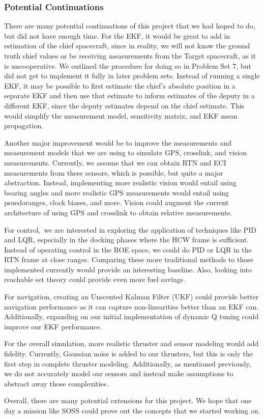 \subsubsection{Potential Continuations}
There are many potential continuations of this project that we had hoped to do, but did not have enough time. For the EKF, it would be great to add in estimation of the chief spacecraft, since in reality, we will not know the ground truth chief values or be receiving measurements from the Target spacecraft, as it is uncooperative. We outlined the procedure for doing so in Problem Set 7, but did not get to implement it fully in later problem sets. Instead of running a single EKF, it may be possible to first estimate the chief's absolute position in a separate EKF and then use that estimate to inform estimates of the deputy in a different EKF, since the deputy estimates depend on the chief estimate. This would simplify the measurement model, sensitivity matrix, and EKF mean propagation.

Another major improvement would be to improve the measurements and measurement models that we are using to simulate GPS, crosslink, and vision measurements. Currently, we assume that we can obtain RTN and ECI measurements from these sensors, which is possible, but quite a major abstraction. Instead, implementing more realistic vision would entail using bearing angles and more realistic GPS measurements would entail using psuedoranges, clock biases, and more. Vision could augment the current architecture of using GPS and crosslink to obtain relative measurements. 

For control, we are interested in exploring the application of techniques like PID and LQR, especially in the docking phases where the HCW frame is sufficient. Instead of operating control in the ROE space, we could do PID or LQR in the RTN frame at close ranges. Comparing these more traditional methods to those implemented currently would provide an interesting baseline. Also, looking into reachable set theory could provide even more fuel savings. 

For navigation, creating an Unscented Kalman Filter (UKF) could provide better navigation performance as it can capture non-linearities better than an EKF can. Additionally, expanding on our initial implementation of dynamic Q tuning could improve our EKF performance. 

For the overall simulation, more realistic thruster and sensor modeling would add fidelity. Currently, Gaussian noise is added to our thrusters, but this is only the first step in complete thruster modeling. Additionally, as mentioned previously, we do not accurately model our sensors and instead make assumptions to abstract away those complexities. 

Overall, there are many potential extensions for this project. We hope that one day a mission like SOSS could prove out the concepts that we started working on. 